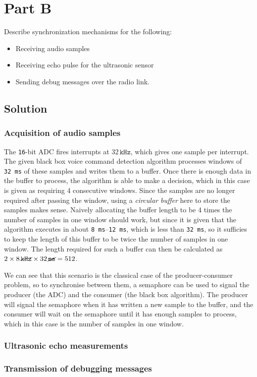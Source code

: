 \section*{Part B}

Describe synchronization mechanisms for the following:
\begin{itemize}[noitemsep, topsep=0pt]
    \item Receiving audio samples
    \item Receiving echo pulse for the ultrasonic sensor
    \item Sending debug messages over the radio link.
\end{itemize}

\subsection*{Solution}

\subsubsection*{Acquisition of audio samples}

The \texttt{16}-bit ADC fires interrupts at \( 32\,\texttt{kHz} \), which gives one sample per interrupt.
The given black box voice command detection algorithm processes windows of \texttt{32\,ms} of these samples and writes them to a buffer.
Once there is enough data in the buffer to process, the algorithm is able to make a decision, which in this case is given as requiring 4 consecutive windows.
Since the samples are no longer required after passing the window, using a \textit{circular buffer} here to store the samples makes sense.
Naively allocating the buffer length to be 4 times the number of samples in one window should work, but since it is given that the algorithm executes in about \texttt{8\,ms}--\texttt{12\,ms}, which is less than \texttt{32\,ms}, so it sufficies to keep the length of this buffer to be twice the number of samples in one window.
The length required for such a buffer can then be calculated as \( 2 \times 8\,\cancel{\texttt{kHz}} \times 32\,\cancel{\texttt{ms}} = 512 \).

We can see that this scenario is the classical case of the producer-consumer problem, so to synchronise between them, a semaphore can be used to signal the producer (the ADC) and the consumer (the black box algorithm).
The producer will signal the semaphore when it has written a new sample to the buffer, and the consumer will wait on the semaphore until it has enough samples to process, which in this case is the number of samples in one window.

\subsubsection*{Ultrasonic echo measurements}

\subsubsection*{Transmission of debugging messages}

